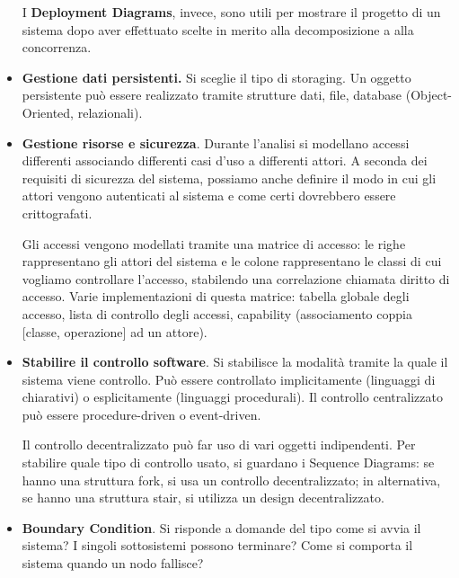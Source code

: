 \documentclass{article}
\begin{document}
\begin{itemize}
                I \textbf{Deployment Diagrams}, invece, sono utili per mostrare il progetto di un sistema dopo aver effettuato scelte in merito alla decomposizione a alla concorrenza.
                
                \item \textbf{Gestione dati persistenti.} Si sceglie il tipo di storaging. Un oggetto persistente può essere realizzato tramite strutture dati, file, database (Object-Oriented, relazionali).
                
                \item \textbf{Gestione risorse e sicurezza}. Durante l’analisi si modellano accessi differenti associando differenti casi d’uso a differenti attori. A seconda dei requisiti di sicurezza del sistema, possiamo anche definire il modo in cui gli attori vengono autenticati al sistema e come certi dovrebbero essere crittografati. 
                
                Gli accessi vengono modellati tramite una matrice di accesso: le righe rappresentano gli attori del sistema e le colone rappresentano le classi di cui vogliamo controllare l’accesso, stabilendo una correlazione chiamata diritto di accesso. Varie implementazioni di questa matrice: tabella globale degli accesso, lista di controllo degli accessi, capability (associamento coppia [classe, operazione] ad un attore).
                
                \item \textbf{Stabilire il controllo software}. Si stabilisce la modalità tramite la quale il sistema viene controllo. Può essere controllato implicitamente (linguaggi di chiarativi) o esplicitamente (linguaggi procedurali). Il controllo centralizzato può essere procedure-driven o event-driven. 
                
                Il controllo decentralizzato può far uso di vari oggetti indipendenti. Per stabilire quale tipo di controllo usato, si guardano i Sequence Diagrams: se hanno una struttura fork, si usa un controllo decentralizzato; in alternativa, se hanno una struttura stair, si utilizza un design decentralizzato.
                
                \item \textbf{Boundary Condition}. Si risponde a domande del tipo come si avvia il sistema? I singoli sottosistemi possono terminare? Come si comporta il sistema quando un nodo fallisce?
            \end{itemize}
\end{document}
